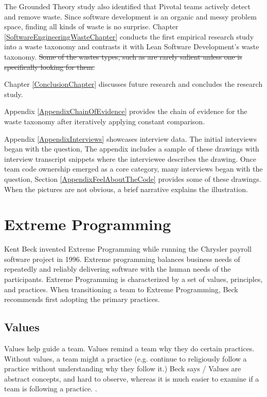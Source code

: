 The Grounded Theory study also identified that Pivotal teams actively detect and remove waste. Since software development is an organic and messy problem space, finding all kinds of waste is no surprise. Chapter \ref{SoftwareEngineeringWasteChapter} conducts the first empirical research study into a waste taxonomy and contrasts it with Lean Software Development's waste taxonomy. \sout{Some of the wastes types, such as  are rarely salient unless one is specifically looking for them.}


Chapter \ref{ConclusionChapter} discusses future research and concludes the research study. 


Appendix \ref{AppendixChainOfEvidence} provides the chain of evidence for the waste taxonomy after iteratively applying constant comparison. 


Appendix \ref{AppendixInterviews} showcases interview data. The initial interviews began with the question,  The appendix includes a sample of these drawings with interview transcript snippets where the interviewee describes the drawing. Once team code ownership emerged as a core category, many interviews began with the question,  Section \ref{AppendixFeelAboutTheCode} provides some of these drawings. When the pictures are not obvious, a brief narrative explains the illustration.




\chapter{Extreme Programming}
\label{ExtremeProgramming}


Kent Beck invented Extreme Programming while running the Chrysler payroll software project in 1996. \cite{BeckExtremeProgramming1999} Extreme programming balances business needs of repeatedly and reliably delivering software with the human needs of the participants. Extreme Programming is characterized by a set of values, principles, and practices. When transitioning a team to Extreme Programming, Beck recommends first adopting the primary practices. 
\section{Values}
Values help guide a team. Values remind a team why they do certain practices. Without values, a team might  a practice (e.g. continue to religiously follow a practice without understanding why they follow it.) Beck says  \cite{BeckExtremeProgramming2004}/ Values are abstract concepts, and hard to observe, whereas it is much easier to examine if a team is following a practice.  \cite{BeckExtremeProgramming2004}.


